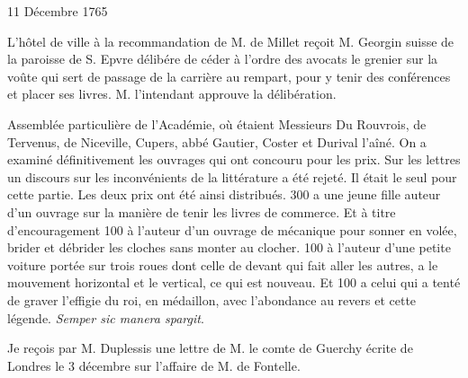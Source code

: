                      \begin{diary}{11 Décembre 1765}{}


                           L'hôtel de ville à la recommandation de M. de
                              Millet reçoit M. Georgin suisse de la
                              paroisse
                              de S. Epvre délibére de céder à l'ordre des
                              avocats le grenier sur la voûte qui sert de
                           passage de la carrière au rempart, pour
                           y tenir des conférences et placer ses livres.
                           M. l'intendant
                           approuve la délibération. \bigskip


                         Assemblée particulière de l'Académie, où étaient Messieurs Du Rouvrois, de Tervenus, de
                              Niceville,
                           Cupers, abbé Gautier, Coster et
                              Durival l'aîné.
                           On a examiné définitivement les ouvrages
                           qui ont concouru pour les prix. Sur les
                           lettres un discours sur les inconvénients de
                              la littérature a été rejeté. Il était le seul
                           pour cette partie. Les deux prix ont été
                           ainsi distribués. 300 a une jeune fille
                           auteur d'un ouvrage sur la manière
                              de
                              tenir les livres de commerce. Et à titre
                           d'encouragement 100 à l'auteur d'un ouvrage
                              de mécanique pour sonner en volée, brider
                              et débrider les cloches sans monter au clocher.
                           100 à l'auteur d'une petite voiture portée
                           sur trois roues dont celle de devant qui
                           fait aller les autres, a le mouvement horizontal
                           et le vertical, ce qui est nouveau. Et 100 a
                           celui qui a tenté de graver l'effigie du roi,
                           en médaillon, avec l'abondance au revers
                           et cette légende. \emph{Semper sic
                              manera spargit}. \bigskip


                         Je
                           reçois par M. Duplessis une lettre
                           de
                           M. le comte de Guerchy
                           écrite de Londres
                           le 3 décembre sur l'affaire de
                              M. de Fontelle. \bigskip


                     \end{diary}

